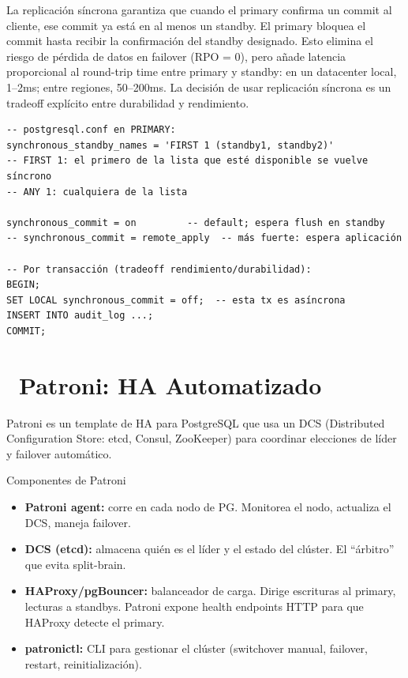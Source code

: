 La replicación síncrona garantiza que cuando el primary confirma un commit al cliente, ese commit ya está en al menos un standby.
El primary bloquea el commit hasta recibir la confirmación del standby designado.
Esto elimina el riesgo de pérdida de datos en failover (RPO = 0), pero añade latencia proporcional al round-trip time entre primary y standby: en un datacenter local, 1--2ms; entre regiones, 50--200ms.
La decisión de usar replicación síncrona es un tradeoff explícito entre durabilidad y rendimiento.

\begin{lstlisting}[caption={Configurar replicación síncrona}]
-- postgresql.conf en PRIMARY:
synchronous_standby_names = 'FIRST 1 (standby1, standby2)'
-- FIRST 1: el primero de la lista que esté disponible se vuelve síncrono
-- ANY 1: cualquiera de la lista

synchronous_commit = on         -- default; espera flush en standby
-- synchronous_commit = remote_apply  -- más fuerte: espera aplicación

-- Por transacción (tradeoff rendimiento/durabilidad):
BEGIN;
SET LOCAL synchronous_commit = off;  -- esta tx es asíncrona
INSERT INTO audit_log ...;
COMMIT;
\end{lstlisting}

\section[Patroni: HA Automatizado]{~Patroni: HA Automatizado}

Patroni es un template de HA para PostgreSQL que usa un DCS (Distributed Configuration Store: etcd, Consul, ZooKeeper) para coordinar elecciones de líder y failover automático.

\begin{teoriabox}{Componentes de Patroni}
\begin{itemize}
  \item \textbf{Patroni agent:} corre en cada nodo de PG. Monitorea el nodo, actualiza el DCS, maneja failover.
  \item \textbf{DCS (etcd):} almacena quién es el líder y el estado del clúster. El ``árbitro'' que evita split-brain.
  \item \textbf{HAProxy/pgBouncer:} balanceador de carga. Dirige escrituras al primary, lecturas a standbys. Patroni expone health endpoints HTTP para que HAProxy detecte el primary.
  \item \textbf{patronictl:} CLI para gestionar el clúster (switchover manual, failover, restart, reinitialización).
\end{itemize}
\end{teoriabox}

